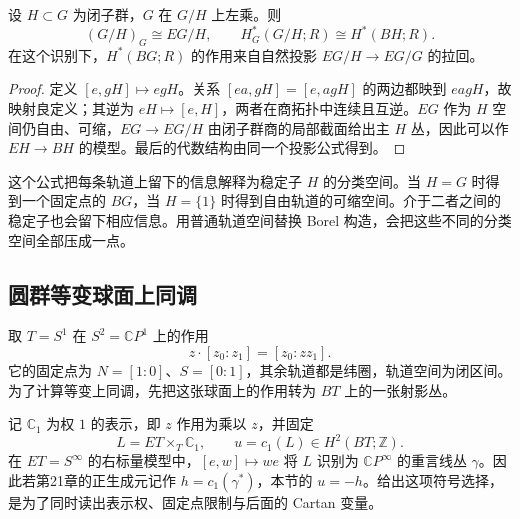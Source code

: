 \begin{proposition}\label{g2:prop:borel-homogeneous-orbit}
	设 \(H\subset G\) 为闭子群，\(G\) 在 \(G/H\) 上左乘。则
	\[
		(G/H)_G\cong EG/H,
		\qquad H_G^*(G/H;R)\cong H^*(BH;R).
	\]
	在这个识别下，\(H^*(BG;R)\) 的作用来自自然投影 \(EG/H\to EG/G\) 的拉回。
\end{proposition}
\begin{proof}
	定义 \([e,gH]\mapsto egH\)。关系 \([ea,gH]=[e,agH]\) 的两边都映到 \(eagH\)，故映射良定义；其逆为 \(eH\mapsto[e,H]\)，两者在商拓扑中连续且互逆。\(EG\) 作为 \(H\) 空间仍自由、可缩，\(EG\to EG/H\) 由闭子群商的局部截面给出主 \(H\) 丛，因此可以作 \(EH\to BH\) 的模型。最后的代数结构由同一个投影公式得到。
\end{proof}

这个公式把每条轨道上留下的信息解释为稳定子 \(H\) 的分类空间。当 \(H=G\) 时得到一个固定点的 \(BG\)，当 \(H=\{1\}\) 时得到自由轨道的可缩空间。介于二者之间的稳定子也会留下相应信息。用普通轨道空间替换 Borel 构造，会把这些不同的分类空间全部压成一点。

\subsection{圆群等变球面上同调}
\label{g2:subsec:C01:03}

取 \(T=S^1\) 在 \(S^2=\mathbb CP^1\) 上的作用
\[
	z\cdot[z_0:z_1]=[z_0:zz_1].
\]
它的固定点为 \(N=[1:0]\)、\(S=[0:1]\)，其余轨道都是纬圈，轨道空间为闭区间。为了计算等变上同调，先把这张球面上的作用转为 \(BT\) 上的一张射影丛。

\ProseParagraphBreak

记 \(\mathbb C_1\) 为权 \(1\) 的表示，即 \(z\) 作用为乘以 \(z\)，并固定
\begin{equation}\label{g2:eq:equivariant-circle-generator}
	L=ET\times_T\mathbb C_1,\qquad u=c_1(L)\in H^2(BT;\mathbb Z).
\end{equation}
在 \(ET=S^\infty\) 的右标量模型中，\([e,w]\mapsto we\) 将 \(L\) 识别为 \(\mathbb CP^\infty\) 的重言线丛 \(\gamma\)。因此若第21章的正生成元记作 \(h=c_1(\gamma^*)\)，本节的 \(u=-h\)。给出这项符号选择，是为了同时读出表示权、固定点限制与后面的 Cartan 变量。

